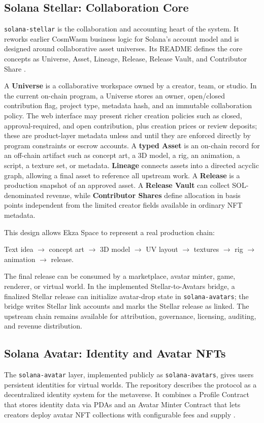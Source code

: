 \documentclass[10pt,twocolumn]{article}
\newcommand{\protocol}[1]{\texttt{#1}}
\newcommand{\bp}{basis points}
\begin{document}
\subsection{Solana Stellar: Collaboration Core}
\protocol{solana-stellar} is the collaboration and accounting heart of the system. It reworks earlier CosmWasm business logic for Solana's account model and is designed around collaborative asset universes. Its README defines the core concepts as Universe, Asset, Lineage, Release, Release Vault, and Contributor Share \cite{solana_stellar}.

A \textbf{Universe} is a collaborative workspace owned by a creator, team, or studio. In the current on-chain program, a Universe stores an owner, open/closed contribution flag, project type, metadata hash, and an immutable collaboration policy. The web interface may present richer creation policies such as closed, approval-required, and open contribution, plus creation prices or review deposits; these are product-layer metadata unless and until they are enforced directly by program constraints or escrow accounts. A \textbf{typed Asset} is an on-chain record for an off-chain artifact such as concept art, a 3D model, a rig, an animation, a script, a texture set, or metadata. \textbf{Lineage} connects assets into a directed acyclic graph, allowing a final asset to reference all upstream work. A \textbf{Release} is a production snapshot of an approved asset. A \textbf{Release Vault} can collect SOL-denominated revenue, while \textbf{Contributor Shares} define allocation in \bp{} independent from the limited creator fields available in ordinary NFT metadata.

This design allows Ekza Space to represent a real production chain:
\begin{center}
\small
Text idea $\rightarrow$ concept art $\rightarrow$ 3D model $\rightarrow$ UV layout $\rightarrow$ textures $\rightarrow$ rig $\rightarrow$ animation $\rightarrow$ release.
\end{center}

The final release can be consumed by a marketplace, avatar minter, game, renderer, or virtual world. In the implemented Stellar-to-Avatars bridge, a finalized Stellar release can initialize avatar-drop state in \protocol{solana-avatars}; the bridge writes Stellar link accounts and marks the Stellar release as linked. The upstream chain remains available for attribution, governance, licensing, auditing, and revenue distribution.

\subsection{Solana Avatar: Identity and Avatar NFTs}
The \protocol{solana-avatar} layer, implemented publicly as \protocol{solana-avatars}, gives users persistent identities for virtual worlds. The repository describes the protocol as a decentralized identity system for the metaverse. It combines a Profile Contract that stores identity data via PDAs and an Avatar Minter Contract that lets creators deploy avatar NFT collections with configurable fees and supply \cite{solana_avatars}.
\end{document}
